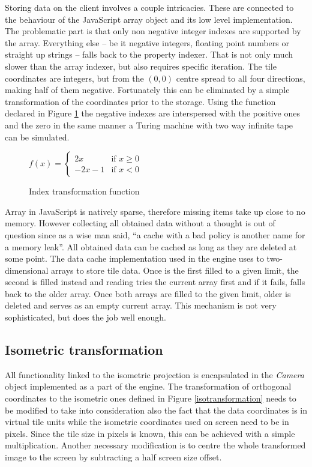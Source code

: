\documentclass[11pt,oneside, final]{fithesis2}
\begin{document}
Storing data on the client involves a couple intricacies. These are connected to the behaviour of the JavaScript array object and its low level implementation. The problematic part is that only non negative integer indexes are supported by the array\cite{ecma}. Everything else -- be it negative integers, floating point numbers or straight up strings -- falls back to the property indexer. That is not only much slower than the array indexer, but also requires specific iteration. The tile coordinates are integers, but from the $(0,0)$ centre spread to all four directions, making half of them negative. Fortunately this can be eliminated by a simple transformation of the coordinates prior to the storage. Using the function declared in Figure \ref{indextransformation} the negative indexes are interspersed with the positive ones and the zero in the same manner a Turing machine with two way infinite tape can be simulated.

\begin{figure}[h]
\centering
\begin{math}
f(x) = 
\left\{
	\begin{array}{ll}
		2x  & \mbox{if } x \geq 0\\
		-2x - 1 & \mbox{if } x < 0
	\end{array}
\right.
\end{math}
\caption{Index transformation function}
\label{indextransformation}
\end{figure}

Array in JavaScript is natively sparse, therefore missing items take up close to no memory\cite{javascriptarray}. However collecting all obtained data without a thought is out of question since as a wise man said, ``a cache with a bad policy is another name for a memory leak''\cite{chen}. All obtained data can be cached as long as they are deleted at some point. The data cache implementation used in the engine uses to two-dimensional arrays to store tile data. Once is the first filled to a given limit, the second is filled instead and reading tries the current array first and if it fails, falls back to the older array. Once both arrays are filled to the given limit, older is deleted and serves as an empty current array. This mechanism is not very sophisticated, but does the job well enough.

\subsection{Isometric transformation}
All functionality linked to the isometric projection is encapsulated in the \emph{Camera} object implemented as a part of the engine. The transformation of orthogonal coordinates to the isometric ones defined in Figure \ref{isotransformation} needs to be modified to take into consideration also the fact that the data coordinates is in virtual tile units while the isometric coordinates used on screen need to be in pixels\cite{pagella}. Since the tile size in pixels is known, this can be achieved with a simple multiplication. Another necessary modification is to centre the whole transformed image to the screen by subtracting a half screen size offset.
\end{document}
